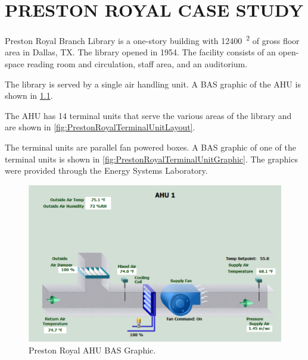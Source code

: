 \chapter{\texorpdfstring{\MakeUppercase{Preston Royal Case Study}}{Preston Royal Case Study}}
\label{sec:preston}

Preston Royal Branch Library is a one-story building with               
\SI{12400}{\feet\squared} of gross floor area in Dallas, TX. The        
library opened in 1954. The facility consists of an open-space reading  
room and circulation, staff area, and an auditorium.                    

The library is served by a single air handling unit. A BAS graphic of
the AHU is shown in \figref{} \ref{fig:PrestonRoyalAHUGraphic}. 

The AHU has 14 terminal units that serve the various areas of the
library and are shown in \figref{}
\ref{fig:PrestonRoyalTerminalUnitLayout}.

The terminal units are parallel fan powered boxes. A BAS graphic of one
of the terminal units is shown in \figref{}
\ref{fig:PrestonRoyalTerminalUnitGraphic}. The graphics were provided
through the Energy Systems Laboratory.

\begin{figure}
\centering
\includegraphics[width=\textwidth]{Images/PrestonRoyalAHUGraphic.PNG}
\caption{Preston Royal AHU BAS Graphic.}
\label{fig:PrestonRoyalAHUGraphic}
\end{figure}

